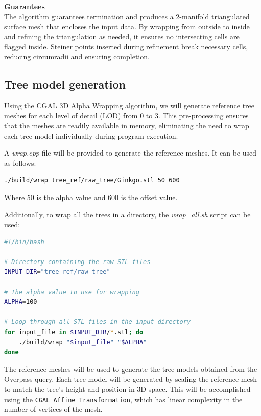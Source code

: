 \documentclass[12pt]{article}
\begin{document}
\textbf{Guarantees} \\
The algorithm guarantees termination and produces a 2-manifold triangulated
surface mesh that encloses the input data. By wrapping from outside to inside
and refining the triangulation as needed, it ensures no intersecting cells are
flagged inside. Steiner points inserted during refinement break necessary cells,
 reducing circumradii and ensuring completion.


\subsection{Tree model generation}
Using the CGAL 3D Alpha Wrapping algorithm, we will generate reference tree
meshes for each level of detail (LOD) from 0 to 3. This pre-processing ensures
that the meshes are readily available in memory, eliminating the need to wrap
each tree model individually during program execution.

A \textit{wrap.cpp} file will be provided to generate the reference meshes.
It can be used as follows:

\begin{lstlisting}[language=bash]
./build/wrap tree_ref/raw_tree/Ginkgo.stl 50 600
\end{lstlisting}

Where 50 is the alpha value and 600 is the offset value.

Additionally, to wrap all the trees in a directory, the \textit{wrap\_all.sh}
script can be used:

\begin{lstlisting}[language=bash]
#!/bin/bash

# Directory containing the raw STL files
INPUT_DIR="tree_ref/raw_tree"

# The alpha value to use for wrapping
ALPHA=100

# Loop through all STL files in the input directory
for input_file in $INPUT_DIR/*.stl; do
	./build/wrap "$input_file" "$ALPHA"
done
\end{lstlisting}

The reference meshes will be used to generate the tree models obtained from
the Overpass query. Each tree model will be generated by scaling the reference
mesh to match the tree's height and position in 3D space. This will be
accomplished using the
\texttt{CGAL Affine Transformation}\cite{cgal_affine_transformation},
which has linear complexity in the number of vertices of the mesh.

\newpage
\end{document}
